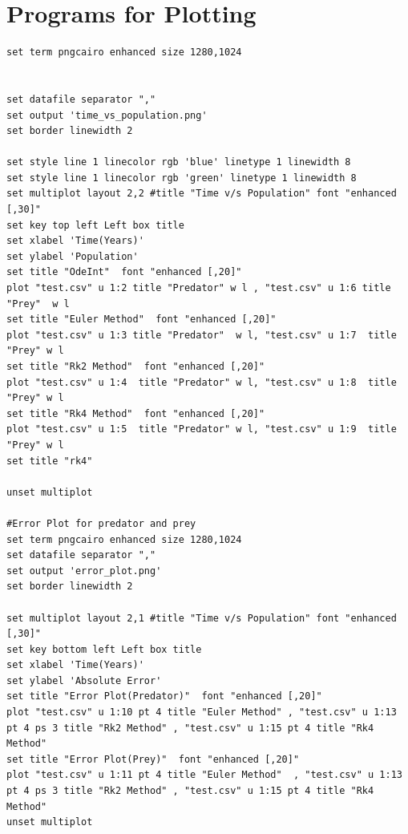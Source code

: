 \documentclass[12pt]{article}
\begin{document}
\section*{Programs for Plotting}
\begin{lstlisting}[language=Gnuplot, caption=Plotting example]
set term pngcairo enhanced size 1280,1024


set datafile separator ","
set output 'time_vs_population.png'
set border linewidth 2

set style line 1 linecolor rgb 'blue' linetype 1 linewidth 8
set style line 1 linecolor rgb 'green' linetype 1 linewidth 8
set multiplot layout 2,2 #title "Time v/s Population" font "enhanced [,30]"
set key top left Left box title 
set xlabel 'Time(Years)' 
set ylabel 'Population'
set title "OdeInt"  font "enhanced [,20]"
plot "test.csv" u 1:2 title "Predator" w l , "test.csv" u 1:6 title "Prey"  w l
set title "Euler Method"  font "enhanced [,20]"
plot "test.csv" u 1:3 title "Predator"  w l, "test.csv" u 1:7  title "Prey" w l
set title "Rk2 Method"  font "enhanced [,20]"
plot "test.csv" u 1:4  title "Predator" w l, "test.csv" u 1:8  title "Prey" w l
set title "Rk4 Method"  font "enhanced [,20]"
plot "test.csv" u 1:5  title "Predator" w l, "test.csv" u 1:9  title "Prey" w l
set title "rk4"

unset multiplot

#Error Plot for predator and prey
set term pngcairo enhanced size 1280,1024
set datafile separator ","
set output 'error_plot.png'
set border linewidth 2

set multiplot layout 2,1 #title "Time v/s Population" font "enhanced [,30]"
set key bottom left Left box title 
set xlabel 'Time(Years)' 
set ylabel 'Absolute Error'
set title "Error Plot(Predator)"  font "enhanced [,20]"
plot "test.csv" u 1:10 pt 4 title "Euler Method" , "test.csv" u 1:13 pt 4 ps 3 title "Rk2 Method" , "test.csv" u 1:15 pt 4 title "Rk4 Method"
set title "Error Plot(Prey)"  font "enhanced [,20]"
plot "test.csv" u 1:11 pt 4 title "Euler Method"  , "test.csv" u 1:13 pt 4 ps 3 title "Rk2 Method" , "test.csv" u 1:15 pt 4 title "Rk4 Method"
unset multiplot
\end{lstlisting}
\newpage 
\end{document}
